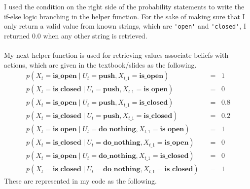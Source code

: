 \documentclass[12pt]{article}
\begin{document}
I used the condition on the right side of the probability statements to write the
if-else logic branching in the helper function. For the sake of making sure that
I only return a valid value from known strings, which are \lstinline{'open'} and
\lstinline{'closed'}, I returned $0.0$ when any other string is retrieved.\\
\vspace{0in}\\
My next helper function is used for retrieving values associate beliefs with
actions, which are given in the textbook/slides as the following.
\begin{align*}
    p(X_t = \mathbf{is\_open} \;|\; U_t = \mathbf{push},  X_{t\_1} = \mathbf{is\_open})\;\;&=\;\;1\\
    p(X_t = \mathbf{is\_closed} \;|\; U_t = \mathbf{push},  X_{t\_1} = \mathbf{is\_open})\;\;&=\;\;0\\
    p(X_t = \mathbf{is\_open} \;|\; U_t = \mathbf{push},  X_{t\_1} = \mathbf{is\_closed})\;\;&=\;\;0.8\\
    p(X_t = \mathbf{is\_closed} \;|\; U_t = \mathbf{push},  X_{t\_1} = \mathbf{is\_closed})\;\;&=\;\;0.2\\
    p(X_t = \mathbf{is\_open} \;|\; U_t = \mathbf{do\_nothing},  X_{t\_1} = \mathbf{is\_open})\;\;&=\;\;1\\
    p(X_t = \mathbf{is\_closed} \;|\; U_t = \mathbf{do\_nothing},  X_{t\_1} = \mathbf{is\_open})\;\;&=\;\;0\\
    p(X_t = \mathbf{is\_open} \;|\; U_t = \mathbf{do\_nothing},  X_{t\_1} = \mathbf{is\_closed})\;\;&=\;\;0\\
    p(X_t = \mathbf{is\_closed} \;|\; U_t = \mathbf{do\_nothing},  X_{t\_1} = \mathbf{is\_closed})\;\;&=\;\;1
\end{align*}
These are represented in my code as the following.


\end{document}
